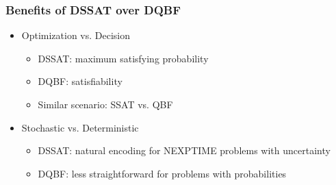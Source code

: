 \begin{frame}
      \frametitle{Benefits of DSSAT over DQBF}
      \begin{itemize}
            \item Optimization vs. Decision
                  \pause
                  \begin{itemize}
                        \item DSSAT: maximum satisfying probability
                              \pause
                        \item DQBF: satisfiability
                              \pause
                        \item Similar scenario: SSAT vs. QBF
                              \pause
                  \end{itemize}
            \item Stochastic vs. Deterministic
                  \pause
                  \begin{itemize}
                        \item DSSAT: natural encoding for NEXPTIME problems with uncertainty
                              \pause
                        \item DQBF: less straightforward for problems with probabilities
                  \end{itemize}
      \end{itemize}
\end{frame}